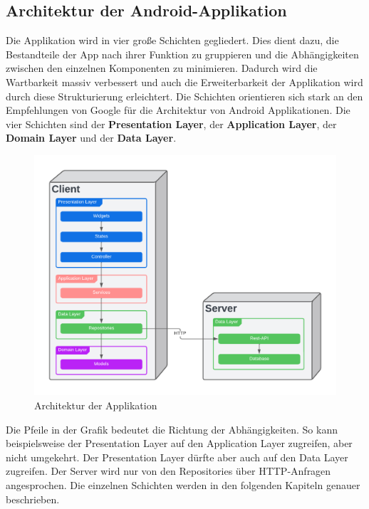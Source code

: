 \documentclass{entwurfsheft}
\begin{document}
\begin{sloppypar}
\subsection{Architektur der Android-Applikation}
Die Applikation wird in vier große Schichten gegliedert. Dies dient dazu, die Bestandteile der App nach ihrer Funktion zu gruppieren und die Abhängigkeiten zwischen den einzelnen Komponenten zu minimieren. Dadurch wird die Wartbarkeit massiv verbessert und auch die Erweiterbarkeit der Applikation wird durch diese Strukturierung erleichtert. Die Schichten orientieren sich stark an den Empfehlungen von Google für die Architektur von Android Applikationen. Die vier Schichten sind der \textbf{Presentation Layer}, der \textbf{Application Layer}, der \textbf{Domain Layer} und der \textbf{Data Layer}.
\begin{figure}[htp]
    \centering
    \includegraphics[height = 0.4\textheight]{images/architecture/architecture.pdf}
    \caption{Architektur der Applikation}
    \label{fig:struktur}
\end{figure}

Die Pfeile in der Grafik bedeutet die Richtung der Abhängigkeiten. So kann beispielsweise der Presentation Layer auf den Application Layer zugreifen, aber nicht umgekehrt. Der Presentation Layer dürfte aber auch auf den Data Layer zugreifen. Der Server wird nur von den Repositories über HTTP-Anfragen angesprochen.
Die einzelnen Schichten werden in den folgenden Kapiteln genauer beschrieben.
\newpage


\end{sloppypar}
\end{document}
